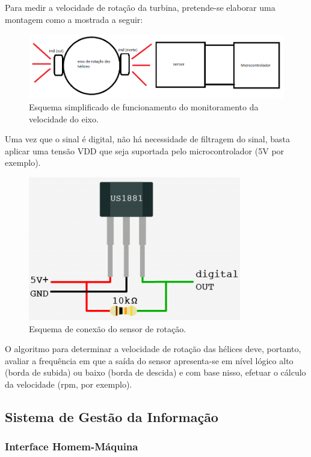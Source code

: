 	Para medir a velocidade de rotação da turbina, pretende-se elaborar uma montagem como a mostrada a seguir:
	 
	\begin{figure}[!htbp]
	  \centering
	  \includegraphics[scale=0.4]{editaveis/figuras/sensor_rotacao_monitoramento_velocidade}
	  \caption[Esquema simplificado de funcionamento do monitoramento da velocidade do eixo]
	  {Esquema simplificado de funcionamento do monitoramento da velocidade do eixo.}
	  \label{sensor_rotacao_monitoramento_velocidade}
	\end{figure}
	
	Uma vez que o sinal é digital, não há necessidade de filtragem do sinal, basta aplicar uma tensão VDD que seja suportada
	pelo microcontrolador (5V por exemplo).
	
	\begin{figure}[!htbp]
	  \centering
	  \includegraphics[scale=0.4]{editaveis/figuras/sensor_rotacao_conexao}
	  \caption[Esquema de conexão do sensor de rotação]
	  {Esquema de conexão do sensor de rotação. \footnotemark}
	  \label{sensor_rotacao_conexao}
	\end{figure}
	
	O algoritmo para determinar a velocidade de rotação das hélices deve, portanto, avaliar a frequência em que a saída do
	sensor apresenta-se em nível lógico alto (borda de subida) ou baixo (borda de descida) e com base nisso, efetuar o
	cálculo da velocidade (rpm, por exemplo).
	
    \vfill
    
    \pagebreak
    \subsection{Sistema de Gestão da Informação}
    
      
      \subsubsection{Interface Homem-Máquina}

    
    
    
    
    